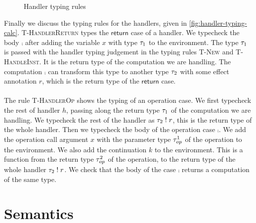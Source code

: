 {\begin{figure}[h]
\caption{Handler typing rules}
\centering
{}
\end{figure}

Finally we discuss the typing rules for the handlers, given in \cref{fig:handler-typing-calc}.
\textsc{T-HandlerReturn} types the $\mathsf{return}$ case of a handler.
We typecheck the body $\comp$ after adding the variable $x$ with type $\tau_1$ to the environment.
The type $\tau_1$ is passed with the handler typing judgement in the typing rules \textsc{T-New} and \textsc{T-HandleInst}.
It is the return type of the computation we are handling.
The computation $\comp$ can transform this type to another type $\tau_2$ with some effect annotation $r$, which is the return type of the $\mathsf{return}$ case.
\\\\
The rule \textsc{T-HandlerOp} shows the typing of an operation case.
We first typecheck the rest of handler $h$, passing along the return type $\tau_1$ of the computation we are handling.
We typecheck the rest of the handler as $\tau_2 \; ! \; r$, this is the return type of the whole handler.
Then we typecheck the body of the operation case $\comp$.
We add the operation call argument $x$ with the parameter type $\tau^1_{op}$ of the operation to the environment.
We also add the continuation $k$ to the environment.
This is a function from the return type $\tau^2_{op}$ of the operation, to the return type of the whole handler $\tau_2 \; ! \; r$.
We check that the body of the case $\comp$ returns a computation of the same type.

\section{Semantics}
\label{sec:semantics}

}
